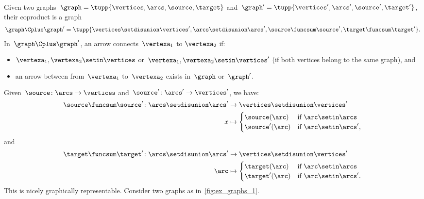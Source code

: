 \begin{example}
    \label{def:ex_graph}
    Given two graphs~$\graph=\tupp{\vertices,\arcs,\source,\target}$ and~$\graph'=\tupp{\vertices',\arcs',\source',\target'}$, their coproduct is a graph
    \begin{equation}
        \graph\Cplus\graph'=\tupp{\vertices \setdisunion\vertices',\arcs \setdisunion\arcs',\source\funcsum\source',\target\funcsum\target'}.
    \end{equation}
    In~$\graph\Cplus\graph'$, an arrow connects~$\vertexa_1$ to $\vertexa_2$ if:
    \begin{itemize}
        \item $\vertexa_1,\vertexa_2\setin \vertices$ or~$\vertexa_1,\vertexa_2\setin \vertices'$ (if both vertices belong to the same graph), and
        \item an arrow between from~$\vertexa_1$ to~$\vertexa_2$ exists in~$\graph$ or~$\graph'$.
    \end{itemize}
    Given~$\source \colon \arcs \to \vertices$ and~$\source'\colon \arcs'\to \vertices'$, we have:
    \begin{equation}
        \begin{aligned}
            \source \funcsum \source'\colon \arcs\setdisunion \arcs' & \to \vertices \setdisunion \vertices' \\
            x                                                        & \mapsto
            \begin{cases}
                \source(\arc)  & \text{if } \arc\setin \arcs   \\
                \source'(\arc) & \text{if } \arc\setin \arcs',
            \end{cases}
        \end{aligned}
    \end{equation}
    and
    \begin{equation}
        \begin{aligned}
            \target \funcsum \target '\colon \arcs\setdisunion \arcs ' & \to \vertices\setdisunion \vertices' \\
            \arc                                                       & \mapsto
            \begin{cases}
                \target(\arc)  & \text{if } \arc\setin \arcs   \\
                \target'(\arc) & \text{if } \arc\setin \arcs'.
            \end{cases}
        \end{aligned}
    \end{equation}
    This is nicely graphically representable.
    Consider two graphs as in~\cref{fig:ex_graphs_1}.


\end{example}
